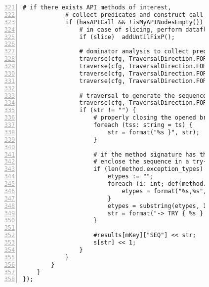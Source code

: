 \begin{figure}[ht!]
\begin{lstlisting}[numbers=left, tabsize=4, escapechar=@, caption={API Usage Mining Analysis},label={lst:aun-code},  firstline = 321, firstnumber = 321, lastline = 381]
            # if there exists API methods of interest, 
            # collect predicates and construct call sequences
		    if (hasAPICall && !isMyAPINodesEmpty()) {
		        # in case of slicing, perform dataflow slicing to capture dependencies
		        if (slice)  addUntilFixP();
		        
		        # dominator analysis to collect preconditions
		        traverse(cfg, TraversalDirection.FORWARD, TraversalKind.SHALLOW_ITERATIVE, allnode_ids);
			    traverse(cfg, TraversalDirection.FORWARD, TraversalKind.HYBRID, cfg_dom, fixp_dom);
			    traverse(cfg, TraversalDirection.FORWARD, TraversalKind.SHALLOW_ITERATIVE, dom_result);
			    traverse(cfg, TraversalDirection.FORWARD, TraversalKind.SHALLOW_ITERATIVE, dom_more);
                
                # traversal to generate the sequence
		        traverse(cfg, TraversalDirection.FORWARD, TraversalKind.SHALLOW_ITERATIVE, seqGen);
    			if (str != "") {
    			    # properly closing the opened braces in the sequence
    				foreach (tss: string = ts) {
    					str = format("%s }", str);
    				}
    				
    				# if the method signature has throws exceptions,
    				# enclose the sequence in a try-catch
    				if (len(method.exception_types) > 0) {
    				    etypes := "";
    				    foreach (i: int; def(method.exception_types[i])) {
    				        etypes = format("%s,%s", etypes, method.exception_types[i].name);
    				    }
    				    etypes = substring(etypes, 1);
    				    str = format("-> TRY { %s } CATCH(%s) {}", str, etypes);
    				}
    				    
    				#results[mKey]["SEQ"] << str; 
    				s[str] << 1; 
    			}
		    }
		}
	}
});
\end{lstlisting}
\end{figure}